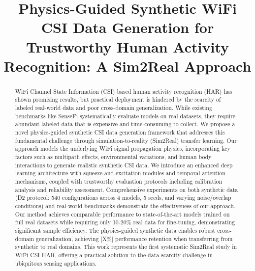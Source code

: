 \documentclass[journal]{IEEEtran}
\begin{document}
\title{Physics-Guided Synthetic WiFi CSI Data Generation for Trustworthy Human Activity Recognition: A Sim2Real Approach}

\author{
}

\maketitle

\begin{abstract}
WiFi Channel State Information (CSI) based human activity recognition (HAR) has shown promising results, but practical deployment is hindered by the scarcity of labeled real-world data and poor cross-domain generalization. While existing benchmarks like SenseFi systematically evaluate models on real datasets, they require abundant labeled data that is expensive and time-consuming to collect. We propose a novel physics-guided synthetic CSI data generation framework that addresses this fundamental challenge through simulation-to-reality (Sim2Real) transfer learning. Our approach models the underlying WiFi signal propagation physics, incorporating key factors such as multipath effects, environmental variations, and human body interactions to generate realistic synthetic CSI data. We introduce an enhanced deep learning architecture with squeeze-and-excitation modules and temporal attention mechanisms, coupled with trustworthy evaluation protocols including calibration analysis and reliability assessment. Comprehensive experiments on both synthetic data (D2 protocol: 540 configurations across 4 models, 5 seeds, and varying noise/overlap conditions) and real-world benchmarks demonstrate the effectiveness of our approach. Our method achieves comparable performance to state-of-the-art models trained on full real datasets while requiring only 10-20\% real data for fine-tuning, demonstrating significant sample efficiency. The physics-guided synthetic data enables robust cross-domain generalization, achieving [X\%] performance retention when transferring from synthetic to real domains. This work represents the first systematic Sim2Real study in WiFi CSI HAR, offering a practical solution to the data scarcity challenge in ubiquitous sensing applications.
\end{abstract}
\end{document}
